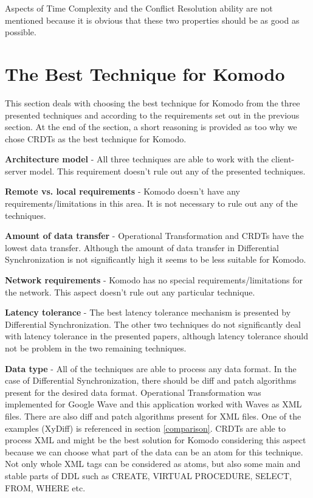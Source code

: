 \documentclass[12pt,oneside]{fithesis2}
\begin{document}
\par Aspects of Time Complexity and the Conflict Resolution ability are not mentioned because it is obvious that these two properties should be as good as possible.
\section{The Best Technique for Komodo} \label{best}
\par This section deals with choosing the best technique for Komodo from the three presented techniques and according to the requirements set out in the previous section. At the end of the section, a short reasoning is provided as too why we chose CRDTs as the best technique for Komodo. 

\vspace{3mm} 

\textbf{Architecture model} - All three techniques are able to work with the client-server model. This requirement doesn't rule out any of the presented techniques.

\vspace{3mm} 

\textbf{Remote vs. local requirements} - Komodo doesn't have any requirements/limitations in this area. It is not necessary to rule out any of the techniques.

\vspace{3mm} 

\textbf{Amount of data transfer} - Operational Transformation and CRDTs have the lowest data transfer. Although the amount of data transfer in Differential Synchronization is not significantly high it seems to be less suitable for Komodo.	

\vspace{3mm} 

\textbf{Network requirements} - Komodo has no special requirements/limitations for the network. This aspect doesn't rule out any particular technique.

\vspace{3mm} 

\textbf{Latency tolerance} - The best latency tolerance mechanism is presented by Differential Synchronization. The other two techniques do not significantly deal with latency tolerance in the presented papers, although latency tolerance should not be problem in the two remaining techniques.

\vspace{3mm} 

\textbf{Data type} - All of the techniques are able to process any data format. In the case of Differential Synchronization, there should be diff and patch algorithms present for the desired data format. Operational Transformation was implemented for Google Wave and this application worked with Waves as XML files. There are also diff and patch algorithms present for XML files. One of the examples (XyDiff) is referenced in section \ref{comparison}. CRDTs are able to process XML and might be the best solution for Komodo considering this aspect because we can choose what part of the data can be an atom for this technique. Not only whole XML tags can be considered as atoms, but also some main and stable parts of DDL such as CREATE, VIRTUAL PROCEDURE, SELECT, FROM, WHERE etc.
\end{document}
